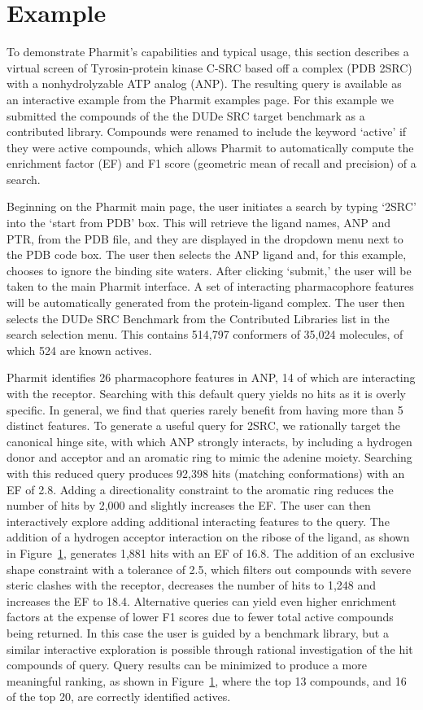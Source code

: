 \section{Example}

To demonstrate Pharmit's capabilities and typical usage, this section describes a virtual screen of Tyrosin-protein kinase C-SRC based off a complex (PDB 2SRC) with a nonhydrolyzable ATP analog (ANP). The resulting query is available as an interactive example from the Pharmit examples page.  For this example we submitted the compounds of the the DUDe \cite{Mysinger_2012} SRC target benchmark as a contributed library.  Compounds were renamed to include the keyword `active' if they were active compounds, which allows Pharmit to automatically compute the enrichment factor (EF) and F1 score (geometric mean of recall and precision) of a search.

  Beginning on the Pharmit main page, the user initiates a search by typing `2SRC' into the `start from PDB' box. This will retrieve the ligand names, ANP and PTR, from the PDB file, and they are displayed in the dropdown menu next to the PDB code box. The user then selects the ANP ligand and, for this example, chooses to ignore the binding site waters. After clicking `submit,' the user will be taken to the main Pharmit interface. A set of interacting pharmacophore features will be automatically generated from the protein-ligand complex.  The user then selects the DUDe SRC Benchmark from the Contributed Libraries list in the search selection menu.  This contains 514,797 conformers of 35,024 molecules, of which 524 are known actives.
  
  Pharmit identifies 26 pharmacophore features in ANP, 14 of which are interacting with the receptor.  Searching with this default query yields no hits as it is overly specific.  In general, we find that queries rarely benefit from having more than 5 distinct features.
  To generate a useful query for 2SRC, we rationally target the canonical hinge site, with which ANP strongly interacts, by including a hydrogen donor and acceptor and an aromatic ring to mimic the adenine moiety.  Searching with this reduced query produces 92,398 hits (matching conformations) with an EF of 2.8.  Adding a directionality constraint to the aromatic ring reduces the number of hits by 2,000 and slightly increases the EF.  The user can then interactively explore adding additional interacting features to the query.  The addition of a hydrogen acceptor interaction on the ribose of the ligand, as shown in Figure~\ref{}, generates 1,881 hits with an EF of 16.8.  The addition of an exclusive shape constraint with a tolerance of 2.5, which filters out compounds with severe steric clashes with the receptor, decreases the number of hits to 1,248 and increases the EF to 18.4. Alternative queries can yield even higher enrichment factors at the expense of lower F1 scores due to fewer total active compounds being returned.  In this case the user is guided by a benchmark library, but a similar interactive exploration is possible through rational investigation of the hit compounds of query.
Query results can be minimized to produce a more meaningful ranking, as shown in Figure~\ref{}, where the top 13 compounds, and 16 of the top 20, are correctly identified actives. 
  
